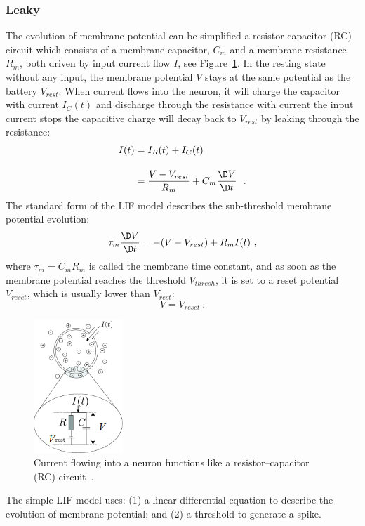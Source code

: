 \subsubsection[Leaky  Integrate-and-Fire Model]{Leaky \protect{} \protect{}}
The evolution of membrane potential can be simplified \protect{} \protect{} a resistor-capacitor (RC) circuit which consists of a membrane capacitor, $C_m$ and a membrane resistance $R_m$, both driven by \protect{} input current flow $I$, see Figure~\ref{Fig:rc}.
In the resting state without any input, the membrane potential $V$ stays at the same potential as the battery $V_{rest}$.
When current flows into the neuron, it will charge the capacitor with current $I_C(t)$ and discharge through the resistance with current \protect{} \protect{} the input current stops \protect{} the capacitive charge will decay back to $V_{rest}$ by leaking through the resistance:
\begin{equation}
\begin{aligned}
	I(t) &= I_R(t) + I_C(t) \\[10pt]
	&= \dfrac{V-V_{rest}}{R_m} + C_m \dfrac{\D V}{\D t}~~.
\end{aligned}
\label{equ:LIF_current}
\end{equation}
The standard form of the LIF model describes the sub-threshold membrane potential evolution:
\begin{equation}
	\tau_m \dfrac{\D V}{\D t} = -(V-V_{rest}) + R_m I(t)~,
\end{equation}
where $\tau_m = C_m R_m$ is called the membrane time constant, and as soon as the membrane potential reaches the threshold $V_{thresh}$, it is set to a reset potential $V_{reset}$, which is usually lower than $V_{rest}$: 
\begin{equation}
V = V_{reset}~.
\end{equation}

\begin{figure}[tb!]
	\centering
	\includegraphics[width=0.3\textwidth]{pics_snn/RC.png}
	\caption{Current flowing into a neuron functions like a resistor–capacitor (RC) circuit~\citep{gerstner2014neuronal}.}
	\label{Fig:rc}
\end{figure}
The simple LIF model uses: (1) a linear differential equation to describe the evolution of membrane potential;
and (2) a threshold to generate a spike.

